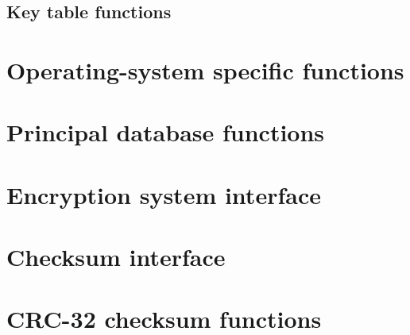 \subsection{Key table functions}


\section{Operating-system specific functions}


\section{Principal database functions}



\section{Encryption system interface}


\section{Checksum interface}


\section{CRC-32 checksum functions}


\appendix
\cleardoublepage



